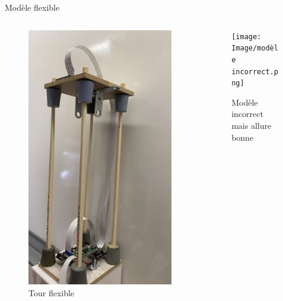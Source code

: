 \documentclass{beamer}
\begin{document}
\begin{frame}{Modèle flexible}
	\begin{columns}
		\begin{column}{0.25\textwidth}
			\begin{figure}
				
			
			\includegraphics[width=\textwidth]{Image/Tour flexible sur tableau blanc.jpg}
			\caption{Tour flexible}
		\end{figure}
		\end{column}
		\begin{column}{0.75\textwidth}
			\begin{figure}
				
			
		\texttt{[image: Image/modèle incorrect.png]}
		\caption{Modèle incorrect mais allure bonne}
	\end{figure}	
		\end{column}
	\end{columns}
\end{frame}
\end{document}
